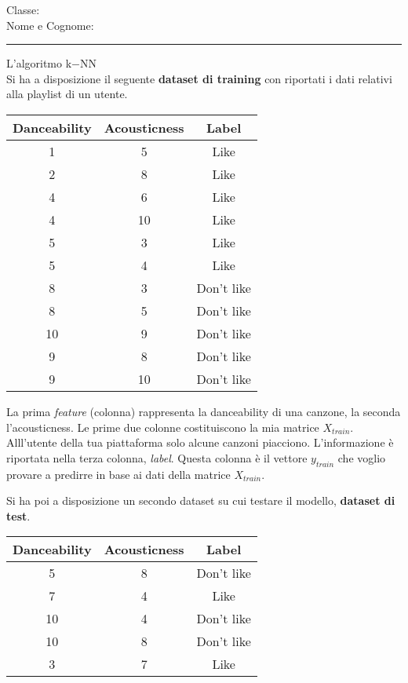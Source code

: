 \documentclass{exam}
\begin{document}

\noindent Classe:\\
Nome e Cognome:


\noindent \rule{\textwidth}{0.4pt}
\Large{L'algoritmo k$-$NN}\\
\normalsize
Si ha a disposizione il seguente \textbf{dataset di training} con riportati i dati relativi alla playlist di un utente.\\

\begin{small}
\begin{tabular}{|c|c|c|}
\hline
Danceability & Acousticness  & Label\\ \hline
1 & 5 & Like \\
2 & 8 & Like\\
4 & 6 &  Like\\
4 & 10 &  Like\\
5 & 3 &  Like\\
5 & 4 &  Like\\
8 & 3 & Don't like\\
8 & 5 & Don't like\\
10 & 9 & Don't like\\
9 & 8 & Don't like\\
9 & 10 & Don't like\\
\hline
\end{tabular}
\end{small}

La prima \textit{feature} (colonna) rappresenta la danceability di una canzone, la seconda l'acousticness. Le prime due colonne costituiscono la mia matrice $X_{train}$.
Alll'utente della tua piattaforma solo alcune canzoni piacciono. L'informazione è riportata nella terza colonna, \textit{label}. Questa colonna è il vettore $y_{train}$ che voglio provare a predirre in base ai dati della matrice $X_{train}$.
 
Si ha poi a disposizione un secondo dataset su cui testare il modello, \textbf{dataset di test}.  \\

\begin{small}
\begin{tabular}{|c|c|c|}
\hline
Danceability & Acousticness  & Label\\ \hline
5 & 8 & Don't like \\
7 & 4 &  Like\\
10 & 4 &  Don't like\\
10 & 8 &  Don't like\\
3 & 7 & Like\\
\hline
\end{tabular}
\end{small}
\end{document}
